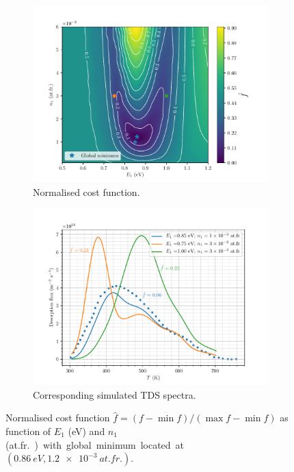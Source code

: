\begin{figure} [h!]
    \centering
        \begin{subfigure}[t]{0.7\linewidth}
            \centering
            \includegraphics[width=\linewidth]{Figures/Chapter3/Parametric_optimisation/cost_function_2D.pdf}
            \caption{Normalised cost function.}
        \end{subfigure}
        \begin{subfigure}[t]{0.7\linewidth}
            \centering
            \includegraphics[width=\linewidth]{Figures/Chapter3/Parametric_optimisation/points_on_cost_function.pdf}
            \caption{Corresponding simulated TDS spectra.}
        \end{subfigure}%
    \caption{Normalised cost function $\hat{f} = (f - \min{f})/(\max{f}-\min{f})$ as function of $E_1$ (\si{eV}) and $n_1$ (\si{at.fr.}) with global minimum located at $(\SI{0.86}{eV}, \SI{1.2e-3}{at.fr.})$.}
    \label{fig:cost function}
\end{figure}

